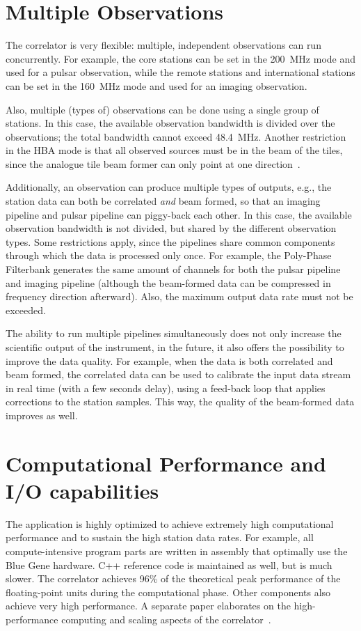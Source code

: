 \section{Multiple Observations}

The correlator is very flexible: multiple, independent observations can
run concurrently.
For example, the core stations can be set in the 200~MHz mode and used for
a pulsar observation, while the remote stations and international stations
can be set in the 160~MHz mode and used for an imaging observation.

Also, multiple (types of) observations can be done using a single group of
stations.
In this case, the available observation bandwidth is divided over the
observations; the total bandwidth cannot exceed 48.4~MHz.
Another restriction in the HBA mode is that all observed sources must be in the
beam of the tiles, since the analogue tile beam former can only point at one
direction~\cite{?}.

Additionally, an observation can produce multiple types of outputs, e.g.,
the station data can both be correlated \emph{and\/} beam formed, so that
an imaging pipeline and pulsar pipeline can piggy-back each other.
In this case, the available observation bandwidth is not divided, but shared
by the different observation types.
Some restrictions apply, since the pipelines share common components through
which the data is processed only once.
For example, the Poly-Phase Filterbank generates the same amount of channels
for both the pulsar pipeline and imaging pipeline (although the beam-formed
data can be compressed in frequency direction afterward).
Also, the maximum output data rate must not be exceeded.

The ability to run multiple pipelines simultaneously does not only increase
the scientific output of the instrument, in the future, it also offers the
possibility to improve the data quality.
For example, when the data is both correlated and beam formed, the correlated
data can be used to calibrate the input data stream in real time (with a few
seconds delay), using a feed-back loop that applies corrections to the station
samples.
This way, the quality of the beam-formed data improves as well.


\section{Computational Performance and I/O capabilities}

The application is highly optimized to achieve extremely high computational
performance and to sustain the high station data rates.
For example, all compute-intensive program parts are written in assembly
that optimally use the Blue Gene hardware.
C++ reference code is maintained as well, but is much slower.
The correlator achieves 96\% of the theoretical peak performance
of the floating-point units during the computational phase.
Other components also achieve very high performance.
A separate paper elaborates on the high-performance computing and scaling
aspects of the correlator~\cite{Romein:10a}.


